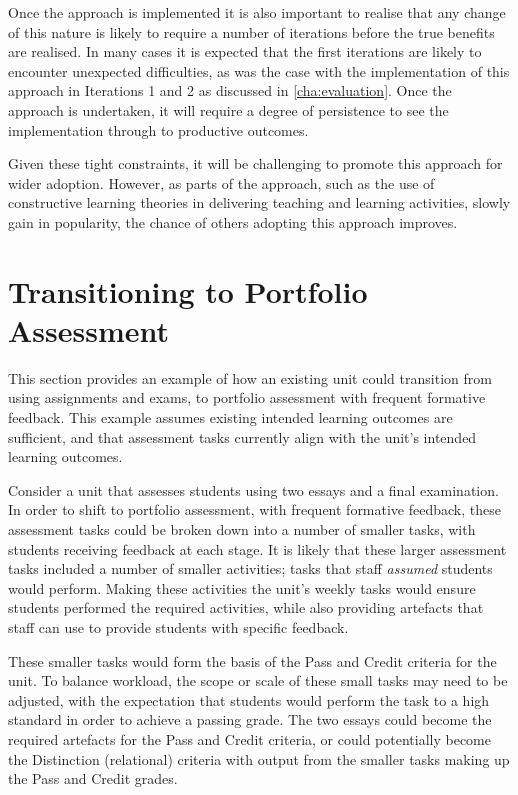 Once the approach is implemented it is also important to realise that any change of this nature is likely to require a number of iterations before the true benefits are realised. In many cases it is expected that the first iterations are likely to encounter unexpected difficulties, as was the case with the implementation of this approach in Iterations 1 and 2 as discussed in \cref{cha:evaluation}. Once the approach is undertaken, it will require a degree of persistence to see the implementation through to productive outcomes. 

Given these tight constraints, it will be challenging to promote this approach for wider adoption. However, as parts of the approach, such as the use of constructive learning theories in delivering teaching and learning activities, slowly gain in popularity, the chance of others adopting this approach improves.







\section{Transitioning to Portfolio Assessment} %
\label{sec:transitioning_to_portfolio_assessment}

This section provides an example of how an existing unit could transition from using assignments and exams, to portfolio assessment with frequent formative feedback. This example assumes existing intended learning outcomes are sufficient, and that assessment tasks currently align with the unit's intended learning outcomes.

Consider a unit that assesses students using two essays and a final examination. In order to shift to portfolio assessment, with frequent formative feedback, these assessment tasks could be broken down into a number of smaller tasks, with students receiving feedback at each stage. It is likely that these larger assessment tasks included a number of smaller activities; tasks that staff \emph{assumed} students would perform. Making these activities the unit's weekly tasks would ensure students performed the required activities, while also providing artefacts that staff can use to provide students with specific feedback.

These smaller tasks would form the basis of the Pass and Credit criteria for the unit. To balance workload, the scope or scale of these small tasks may need to be adjusted, with the expectation that students would perform the task to a high standard in order to achieve a passing grade. The two essays could become the required artefacts for the Pass and Credit criteria, or could potentially become the Distinction (relational) criteria with output from the smaller tasks making up the Pass and Credit grades.

